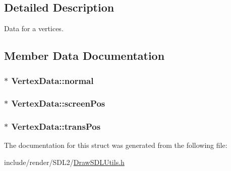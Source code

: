 \subsection{Detailed Description}
Data for a vertices. 

\subsection{Member Data Documentation}
\hypertarget{structVertexData_a2f5a411c463380126b69d98267013dd6}{
\subsubsection[{normal}]{$\ast$ Vertex\-Data\-::normal}}\label{structVertexData_a2f5a411c463380126b69d98267013dd6}
\hypertarget{structVertexData_a78115f59b134cb53c0af1a0d834497e4}{
\subsubsection[{screen\-Pos}]{$\ast$ Vertex\-Data\-::screen\-Pos}}\label{structVertexData_a78115f59b134cb53c0af1a0d834497e4}
\hypertarget{structVertexData_a81b1a0a402d1efcea84d098dc1d391b4}{
\subsubsection[{trans\-Pos}]{$\ast$ Vertex\-Data\-::trans\-Pos}}\label{structVertexData_a81b1a0a402d1efcea84d098dc1d391b4}


The documentation for this struct was generated from the following file\-:\begin{DoxyCompactItemize}
\item 
include/render/\-S\-D\-L2/\hyperlink{DrawSDLUtils_8h}{Draw\-S\-D\-L\-Utils.\-h}\end{DoxyCompactItemize}
